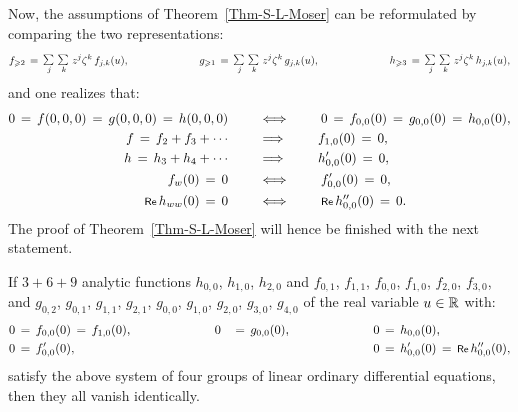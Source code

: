 \documentclass[12pt,twoside,leqno,openany]{amsart}
\begin{document}
Now, the assumptions of 
Theorem~{\ref{Thm-S-L-Moser}}
can be reformulated by comparing the two representations:
\[
f_{\geqslant 2}
\,=\,
\smallsum{j}\,\smallsum{k}\,
z^j\zeta^k\,
f_{j,k}(u),
\ \ \ \ \ \ \ \ \ \ \ \ \ \ \ \ \ \ \ \
g_{\geqslant 1}
\,=\,
\smallsum{j}\,\smallsum{k}\,
z^j\zeta^k\,
g_{j,k}(u),
\ \ \ \ \ \ \ \ \ \ \ \ \ \ \ \ \ \ \ \
h_{\geqslant 3}
\,=\,
\smallsum{j}\,\smallsum{k}\,
z^j\zeta^k\,
h_{j,k}(u),
\]
and one realizes that:
\[
\aligned
0
\,=\,
f(0,0,0)
\,=\,
g(0,0,0)
\,=\,
h(0,0,0)
\ \ \ \ \ \ \ 
&
\Longleftrightarrow
\ \ \ \ \ \ \ 
0
\,=\,
f_{0,0}(0)
\,=\,
g_{0,0}(0)
\,=\,
h_{0,0}(0),
\\
f
\,=\,
f_2+f_3+\cdots
\ \ \ \ \ \ \ 
&
\Longrightarrow
\ \ \ \ \ \ \ 
f_{1,0}(0)
\,=\,
0,
\\
h
\,=\,
h_3+h_4+\cdots
\ \ \ \ \ \ \ 
&
\Longrightarrow
\ \ \ \ \ \ \ 
h_{0,0}'(0)
\,=\,
0,
\\
f_w(0)
\,=\,
0
\ \ \ \ \ \ \ 
&
\Longleftrightarrow
\ \ \ \ \ \ \ 
f_{0,0}'(0)
\,=\,
0,
\\
\Re\,h_{ww}(0)
\,=\,
0
\ \ \ \ \ \ \ 
&
\Longleftrightarrow
\ \ \ \ \ \ \ 
\Re\,h_{0,0}''(0)
\,=\,
0.
\endaligned
\]
The proof of Theorem~{\ref{Thm-S-L-Moser}} will hence be finished
with the next statement.
\endproof

\begin{Proposition}
If $3 + 6 + 9$ analytic functions 
$h_{0,0}$, $h_{1,0}$, $h_{2,0}$ 
and $f_{0,1}$, $f_{1,1}$, $f_{0,0}$, $f_{1,0}$, $f_{2,0}$, $f_{3,0}$,
and $g_{0,2}$, $g_{0,1}$, $g_{1,1}$, $g_{2,1}$,
$g_{0,0}$, $g_{1,0}$, $g_{2,0}$, $g_{3,0}$, $g_{4,0}$ 
of the real variable $u \in \mathbb{R}$ 
with:
\[
\aligned
0
&
\,=\,
f_{0,0}(0)
\,=\,
f_{1,0}(0),
\ \ \ \ \ \ \ \ \ \ \ \ \ \ \ \ \ \ \ \
0
&
\,=\,
g_{0,0}(0),
\ \ \ \ \ \ \ \ \ \ \ \ \ \ \ \ \ \ \ \
0
&
\,=\,
h_{0,0}(0),
\\
0
&
\,=\,
f_{0,0}'(0),
\ \ \ \ \ 
&
\ \ \ \ \ 
0
&
\,=\,
h_{0,0}'(0)
\,=\,
\Re\,h_{0,0}''(0),
\endaligned
\]
satisfy the above system of four groups of
linear ordinary differential equations,
then they all vanish identically.
\end{Proposition}
\end{document}

